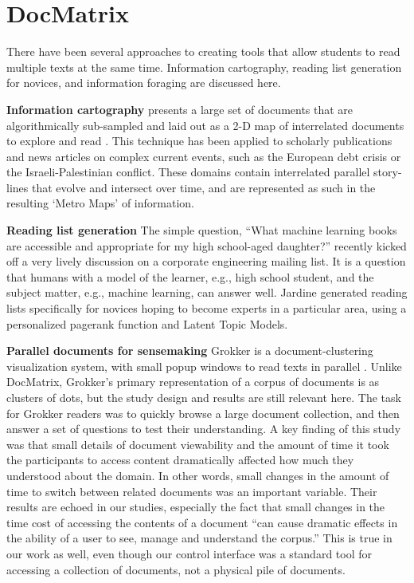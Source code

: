 \section{DocMatrix}

There have been several approaches to creating tools that allow students to read multiple texts at the same time.  Information cartography, reading list generation for novices, and information foraging are discussed here.


\textbf{Information cartography} presents a large set of documents that are algorithmically sub-sampled and laid out as a 2-D map of interrelated documents to explore and read \cite{shahaf}. This technique has been applied to scholarly publications and news articles on complex current events, such as the European debt crisis or the Israeli-Palestinian conflict. These domains contain interrelated parallel story-lines that evolve and intersect over time, and are represented as such in the resulting ‘Metro Maps’ of information.

\textbf{Reading list generation} The simple question, ``What machine learning books are accessible and appropriate for my high school-aged daughter?'' recently kicked off a very lively discussion on a corporate engineering mailing list. It is a question that humans with a model of the learner, e.g., high school student, and the subject matter, e.g., machine learning, can answer well. Jardine \cite{jardine} generated reading lists specifically for novices hoping to become experts in a particular area, using a personalized pagerank function and Latent Topic Models. 


\textbf{Parallel documents for sensemaking} Grokker is a document-clustering visualization system, with small popup windows to read texts in parallel \cite{slaney}. Unlike DocMatrix, Grokker's primary representation of a corpus of documents is as clusters of dots, but the study design and results are still relevant here. The task for Grokker readers was to quickly browse a large document collection, and then answer a set of questions to test their understanding. A key finding of this study was that small details of document viewability and the amount of time it took the participants to access content dramatically affected how much they understood about the domain.  In other words, small changes in the amount of time to switch between related documents was an important variable.  Their results are echoed in our studies, especially the fact that small changes in the time cost of accessing the contents of a document ``can cause dramatic effects in the ability of a user to see, manage and understand the corpus.'' This is true in our work as well, even though our control interface was a standard tool for accessing a collection of documents, not a physical pile of documents. 

